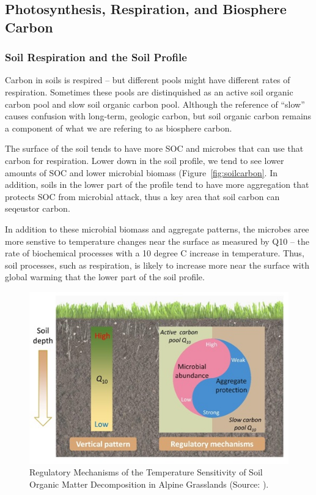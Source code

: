 \documentclass{book}\usepackage{knitr}
\begin{document}
\begin{knitrout}
\begin{kframe}
\subsection{Photosynthesis, Respiration, and Biosphere Carbon}

\subsubsection{Soil Respiration and the Soil Profile}

Carbon in soils is respired -- but different pools might have different rates of respiration. Sometimes these pools are distinquished as an active soil organic carbon pool and slow soil organic carbon pool. Although the reference of ``slow'' causes confusion with long-term, geologic carbon, but soil organic carbon remains a component of what we are refering to as biosphere carbon. 

The surface of the soil tends to have more SOC and microbes that can use that carbon for respiration. Lower down in the soil profile, we tend to see lower amounts of SOC and lower microbial biomass (Figure~\ref{fig:soilcarbon}. In addition, soils in the lower part of the profile tend to have more aggregation that protects SOC from microbial attack, thus a key area that soil carbon can seqeustor carbon. 

In addition to these microbial biomass and aggregate patterns, the microbes aree more senstive to temperature changes near the surface as measured by Q10 -- the rate of biochemical processes with a 10 degree C increase in temperature. Thus, soil processes, such as respiration, is likely to increase more near the surface with global warming that the lower part of the soil profile.  

\begin{figure}
\includegraphics[width=\linewidth]{images/earth-system/Q10-SOC-Regulation.jpg}
\caption{Regulatory Mechanisms of the Temperature Sensitivity of Soil Organic Matter Decomposition in Alpine Grasslands (Source: \citet{Qineaau1218, CAS2021researchers}).}
\label{fig:Q10-SOC}
\end{figure}



\end{kframe}
\end{knitrout}
\end{document}
